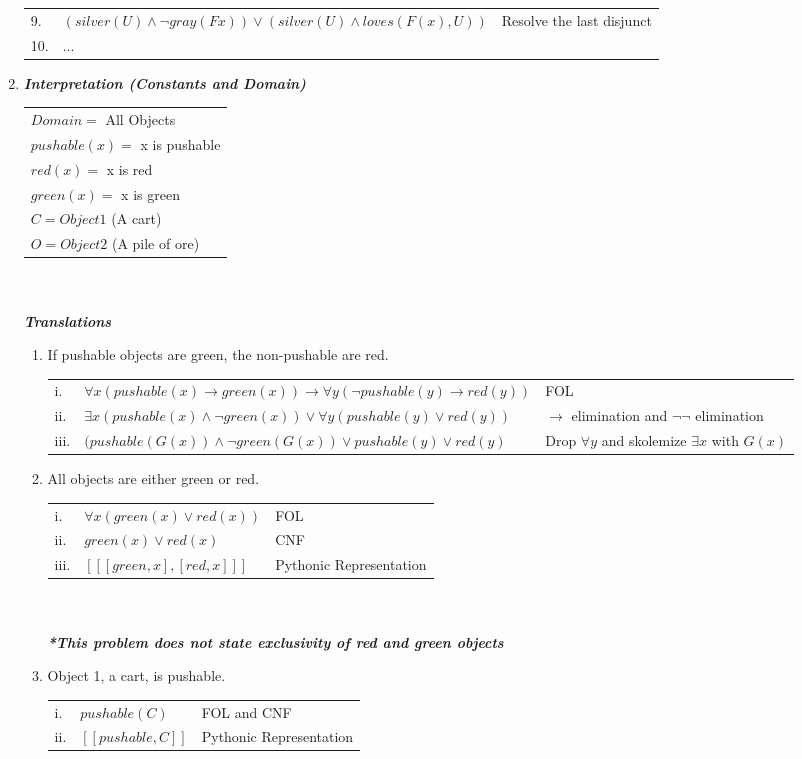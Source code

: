 \documentclass{article}
\begin{document}
\begin{enumerate}
\begin{tabular}{lll}
        9. & $(silver(U) \wedge \neg gray(Fx)) \vee (silver(U) \wedge loves(F(x), U))$ & Resolve the last disjunct\\
        10. & ... &\\
    \end{tabular}
    \pagebreak
    \item %
    \textit{\textbf{Interpretation (Constants and Domain)}}\\
    \begin{tabular}{l}
        $Domain =$ All Objects\\
        $pushable(x) =$ x is pushable\\
        $red(x) =$ x is red\\
        $green(x) =$ x is green\\
        $C = Object 1$ (A cart)\\
        $O = Object 2$ (A pile of ore)\\
    \end{tabular}\\\\
    \textit{\textbf{Translations}}
    \begin{enumerate}
        \item If pushable objects are green, the non-pushable are red.\\
        \begin{tabular}{lll}
            i. & $\forall x (pushable(x) \rightarrow green(x)) \rightarrow \forall y (\neg pushable(y) \rightarrow red(y))$ & FOL\\
            ii. & $\exists x(pushable(x) \wedge \neg green(x)) \vee \forall y(pushable(y) \vee red(y))$ & $\rightarrow$ elimination and $\neg\neg$ elimination\\
            iii. & $(pushable(G(x)) \wedge \neg green(G(x)) \vee pushable(y) \vee red(y)$& Drop $\forall y$ and skolemize $\exists x$ with $G(x)$
        \end{tabular}
        \item All objects are either green or red.\\
        \begin{tabular}{lll}
            i. & $\forall x (green(x) \vee red(x))$ & FOL\\
            ii. & $green(x) \vee red(x)$ & CNF\\
            iii. & $[[[green,x],[red,x]]]$  & Pythonic Representation\\
        \end{tabular}\\\\
        \textit{\textbf{*This problem does not state exclusivity of red and green objects}}
        \item Object 1, a cart, is pushable.\\
        \begin{tabular}{lll}
            i. & $pushable(C)$ & FOL and CNF\\
            ii. & $[[pushable, C]]$  & Pythonic Representation
        \end{tabular}\\


\end{enumerate}
\end{enumerate}
\end{document}
